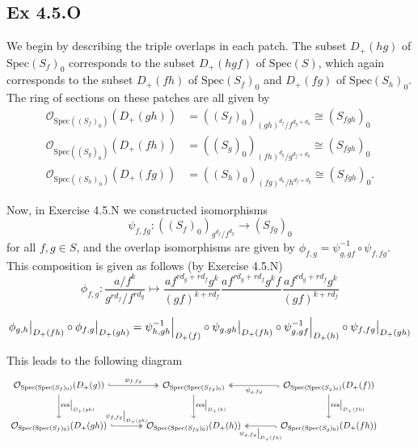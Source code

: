 \documentclass{article}
\newcommand\restr[2]{{%
  \left.\kern-\nulldelimiterspace %
  #1 %
  \vphantom{\big|} %
  \right|_{#2} %
  }}
\theoremstyle{definition}
\newcommand{\oo}{\mathcal{O}}
\newcommand{\osp}[1]{\oo_{\Spec\left(#1\right)}}
\newcommand{\Spec}{\text{Spec}}
\begin{document}
\subsection*{Ex 4.5.O}

We begin by describing the triple overlaps in each patch. The subset
$D_{+}(hg)$ of $\Spec(S_f)_0$ corresponds to the subset $D_{+}(hgf)$ of
$\Spec(S)$, which again corresponds to the subset $D_{+}(fh)$ of
$\Spec(S_{f})_0$ and $D_{+}(fg)$ of $\Spec(S_h)_0$. The ring of sections on
these patches are all given by
\begin{align*}
	\osp{(S_f)_0}(D_{+}(gh)) & = ((S_f)_0)_{(gh)^{d_f} / f^{d_g + d_h}} \cong (S_{fgh})_0  \\
	\osp{(S_g)_0}(D_{+}(fh)) & = ((S_g)_0)_{(fh)^{d_g} / g^{d_f + d_h}} \cong (S_{fgh})_0  \\
	\osp{(S_h)_0}(D_{+}(fg)) & = ((S_h)_0)_{(fg)^{d_h} / h^{d_f + d_g}} \cong (S_{fgh})_0.
\end{align*}

Now, in Exercise 4.5.N we constructed isomorphisms
\[
	\psi_{f, fg}
	:
	((S_f)_0)_{g^{d_f}/f^{d_g}}
	\to
	(S_{fg})_0
\]
for all $f, g \in S$, and the overlap isomorphisms are given by $\phi_{f, g} =
	\psi_{g, gf}^{-1} \circ \psi_{f, fg}$. This composition is given as follows (by
Exercise 4.5.N)
\[
	\phi_{f, g}
	:
	\frac{a/f^k}{g^{r d_f} / f^{r d_g}}
	\mapsto
	\frac{a f^{r d_g + r d_f} g^k}{(gf)^{k + r d_f}}
	\frac{a f^{r d_g + r d_f} g^k f}{}
	\frac{a f^{r d_g + r d_f} g^k}{(gf)^{k + r d_f}}
\]

\[
	\restr{\phi_{g, h}}{D_{+}(fh)}
	\circ
	\restr{\phi_{f, g}}{D_{+}(gh)}
	=
	\restr{\psi_{h, gh}^{-1}}{D_{+}(f)} \circ \restr{\psi_{g, gh}}{D_{+}(fh)}
	\circ
	\restr{\psi_{g, gf}^{-1}}{D_{+}(h)} \circ \restr{\psi_{f, fg}}{D_{+}(gh)}
\]

This leads to the following diagram
\[
	\begin{tikzcd}[row sep=large, column sep = large]
		\osp{\Spec(S_f)_0}(D_+(g))
		\arrow[hook, two heads, r, "\psi_{f, fg}"]
		\arrow[d, "\restr{\text{res}}{D_{+}(gh)}"]
		&
		\osp{\Spec(S_{fg})_0}
		\arrow[d, "\restr{\text{res}}{D_{+}(h)}"]
		&
		\osp{\Spec(S_g)_0}(D_+(f))
		\arrow[hook, two heads, l, "\psi_{g, fg}"]
		\arrow[d, "\restr{\text{res}}{D_{+}(fh)}"]
		&
		\\
		\osp{\Spec(S_f)_0}(D_+(gh))
		\arrow[hook, two heads, r, "\restr{\psi_{f, fg}}{D_{+}(gh)}"]
		&
		\osp{\Spec(S_{fg})_0}(D_{+}(h))
		&
		\osp{\Spec(S_g)_0}(D_+(fh))
		\arrow[hook, two heads, l, "\restr{\psi_{g, fg}}{D_{+}(fh)}"]
		&
	\end{tikzcd}
\]
\end{document}
